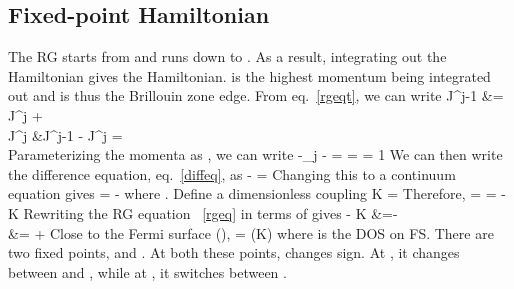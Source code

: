 \documentclass[14pt]{extarticle}
\numberwithin{equation}{section}
\begin{document}
{\subsection{Fixed-point Hamiltonian}
The RG starts from  and runs down to .
As a result, integrating out the  Hamiltonian gives the  Hamiltonian.
 is the highest momentum being integrated out and is thus the Brillouin zone edge.
From eq.~\ref{rgeqt}, we can write
\beq[diffeq]
J^{j-1} &= J^j + \\
\implies \Delta J^j &\equiv J^{j-1} - J^j = \\
\eeq
Parameterizing the momenta as , we can write 
\beq
-\Delta \log \Lambda_j \equiv - = \log {}=\log {} = 1
\eeq
We can then write the difference equation, eq.~\ref{diffeq}, as
\beq
- = 
\eeq
Changing this to a continuum equation gives
\beq[rgeq]
  = - 
\eeq
where .
Define a dimensionless coupling 
\beq
K = 
\eeq
Therefore,
\beq
{} =  = \rr{\omega - \tilde \Lambda} - K
\eeq
Rewriting the RG equation ~\ref{rgeq} in terms of  gives
\beq
\rr{\omega - \tilde \Lambda} - K &=-  \\
\implies \tilde \Lambda {} &=  + 
\eeq
Close to the Fermi surface (),
\beq[fseqtn]
 =  \equiv \beta(K)
\eeq
where  is the DOS on FS.
There are two fixed points,  and .
At both these points,  changes sign.
At , it changes between  and , while at , it switches between \il{\pm \infty}.
}
\end{document}

